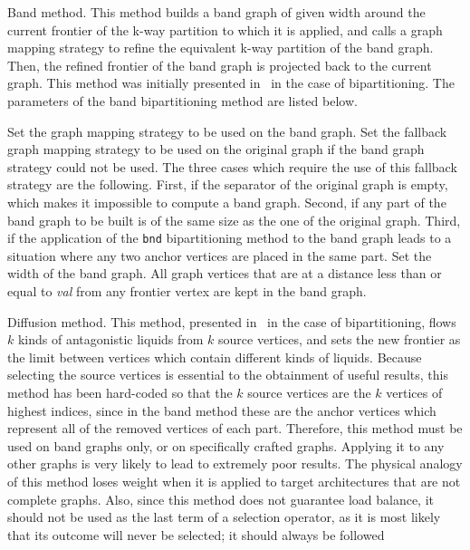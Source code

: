 \begin{itemize}
\iteme[{\tt b}]
Band method. This method builds a band graph of given width around the
current frontier of the k-way partition to which it is applied, and
calls a graph mapping strategy to refine the equivalent k-way
partition of the band graph. Then, the refined frontier of the band
graph is projected back to the current graph. This method was
initially presented in~\cite{chpe06a} in the case of bipartitioning.
The parameters of the band bipartitioning method are listed below.
\begin{itemize}
\iteme[{\tt bnd=}{\it strat}]
Set the graph mapping strategy to be used on the band graph.
\iteme[{\tt org=}{\it strat}]
Set the fallback graph mapping strategy to be used on the
original graph if the band graph strategy could not be used. The three
cases which require the use of this fallback strategy are the
following. First, if the separator of the original graph is empty,
which makes it impossible to compute a band graph. Second, if any part
of the band graph to be built is of the same size as the one of the
original graph. Third, if the application of the {\tt bnd}
bipartitioning method to the band graph leads to a situation where any
two anchor vertices are placed in the same part.
\iteme[{\tt width=}{\it val}]
Set the width of the band graph. All graph vertices that are at a
distance less than or equal to {\it val} from any frontier vertex
are kept in the band graph.
\end{itemize}
\iteme[{\tt d}]
Diffusion method. This method, presented in~\cite{pell07b} in the case
of bipartitioning, flows $k$ kinds of antagonistic liquids from $k$
source vertices, and sets the new frontier as the limit between vertices
which contain different kinds of liquids. Because
selecting the source vertices is essential to the obtainment of useful
results, this method has been hard-coded so that the $k$ source
vertices are the $k$ vertices of highest indices, since in the band
method these are the anchor vertices which represent all of the removed
vertices of each part. Therefore, this method must be used on band
graphs only, or on specifically crafted graphs. Applying it to any
other graphs is very likely to lead to extremely poor results.
The physical analogy of this method loses weight when it is applied to
target architectures that are not complete graphs.
Also, since this method does not guarantee load balance, it should not
be used as the last term of a selection operator, as it is most likely
that its outcome will never be selected; it should always be followed

\end{itemize}

